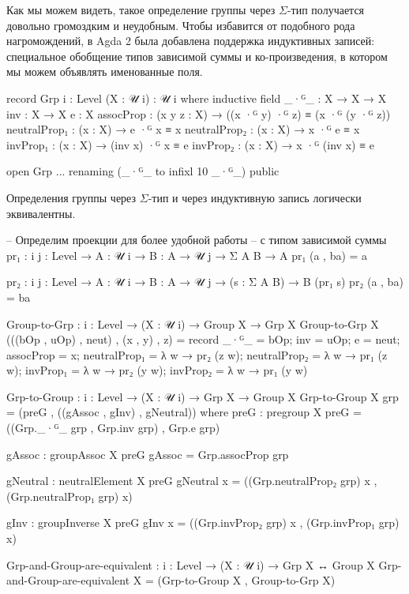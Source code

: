 \documentclass{article}[12pt]
\begin{document}
Как мы можем видеть, такое определение группы через $\Sigma$-тип получается довольно громоздким
и неудобным. Чтобы избавится от подобного рода нагромождений, в Agda 2 была добавлена поддержка
индуктивных записей: специальное обобщение типов зависимой суммы и ко-произведения, в котором мы можем
объявлять именованные поля.
\begin{code}
record Grp {i : Level} (X : 𝒰 i) : 𝒰 i where
    inductive
    field
        _·ᴳ_ : X → X → X
        inv : X → X
        e : X
        assocProp : (x y z : X) → ((x ·ᴳ y) ·ᴳ z) ≡ (x ·ᴳ (y ·ᴳ z))
        neutralProp₁ : (x : X) → e ·ᴳ x ≡ x
        neutralProp₂ : (x : X) → x ·ᴳ e ≡ x
        invProp₁ : (x : X) → (inv x) ·ᴳ x ≡ e
        invProp₂ : (x : X) → x ·ᴳ (inv x) ≡ e

open Grp {{...}} renaming (_·ᴳ_ to infixl 10 _·ᴳ_) public
\end{code}
Определения группы через $\Sigma$-тип и через индуктивную запись логически эквивалентны.
\begin{code}
-- Определим проекции для более удобной работы
-- с типом зависимой суммы
pr₁ : {i j : Level} → {A : 𝒰 i} → {B : A → 𝒰 j}
      → Σ A B → A
pr₁ (a , ba) = a

pr₂ : {i j : Level} → {A : 𝒰 i} → {B : A → 𝒰 j}
      → (s : Σ A B) → B (pr₁ s)
pr₂ (a , ba) = ba

Group-to-Grp : {i : Level} → (X : 𝒰 i) → Group X → Grp X
Group-to-Grp X (((bOp , uOp) , neut) , (x , y) , z) = 
    record {_·ᴳ_ = bOp;
            inv = uOp;
            e = neut;
            assocProp = x;
            neutralProp₁ = λ w → pr₂ (z w);
            neutralProp₂ = λ w → pr₁ (z w);
            invProp₁ = λ w → pr₂ (y w);
            invProp₂ = λ w → pr₁ (y w)}

Grp-to-Group : {i : Level} → (X : 𝒰 i) → Grp X → Group X
Grp-to-Group X grp = (preG , ((gAssoc , gInv) , gNeutral))
    where
        preG : pregroup X
        preG = ((Grp._·ᴳ_ grp , Grp.inv grp) , Grp.e grp)

        gAssoc : groupAssoc X preG
        gAssoc = Grp.assocProp grp

        gNeutral : neutralElement X preG
        gNeutral x = ((Grp.neutralProp₂ grp) x , (Grp.neutralProp₁ grp) x)

        gInv : groupInverse X preG
        gInv x = ((Grp.invProp₂ grp) x , (Grp.invProp₁ grp) x)

Grp-and-Group-are-equivalent : {i : Level} → (X : 𝒰 i) → Grp X ↔ Group X
Grp-and-Group-are-equivalent X = (Grp-to-Group X , Group-to-Grp X)
\end{code}
\end{document}
